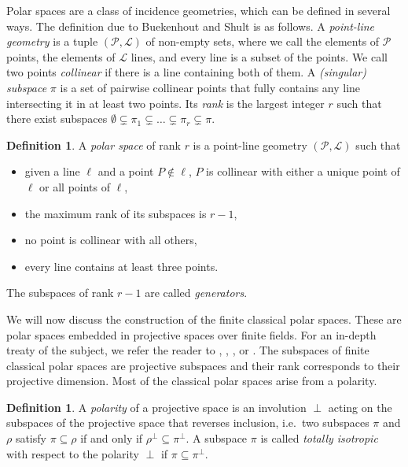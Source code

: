 \documentclass[a4paper]{article}
\theoremstyle{definition}
\newtheorem{df}[thm]{Definition}
\newcommand{\pp}{\mathcal P}
\newcommand{\ml}{\mathcal L}
\begin{document}
Polar spaces are a class of incidence geometries, which can be defined in several ways.
The definition due to Buekenhout and Shult \cite{buekenhoutshult} is as follows.
A \emph{point-line geometry} is a tuple $(\pp,\ml)$ of non-empty sets, where we call the elements of $\pp$ points, the elements of $\ml$ lines, and every line is a subset of the points.
We call two points \emph{collinear} if there is a line containing both of them.
A \emph{(singular) subspace} $\pi$ is a set of pairwise collinear points that fully contains any line intersecting it in at least two points.
Its \emph{rank} is the largest integer $r$ such that there exist subspaces $\emptyset \subsetneq \pi_1 \subsetneq \ldots \subsetneq \pi_r \subsetneq \pi$.
\begin{df}
 A \emph{polar space} of rank $r$ is a point-line geometry $(\pp,\ml)$ such that
 \begin{itemize}
  \item given a line $\ell$ and a point $P \notin \ell$, $P$ is collinear with either a unique point of $\ell$ or all points of $\ell$,
  \item the maximum rank of its subspaces is $r-1$,
  \item no point is collinear with all others,
  \item every line contains at least three points.
 \end{itemize}
 The subspaces of rank $r-1$ are called \emph{generators}.
\end{df}

We will now discuss the construction of the finite classical polar spaces.
These are polar spaces embedded in projective spaces over finite fields.
For an in-depth treaty of the subject, we refer the reader to \cite[\S 2]{brouwervanmaldeghem}, \cite[\S\S 1, 2, 5.1]{hirschfeldthas}, \cite[\S 7]{Shult11}, or \cite{BuekenhoutCameron}. 
The subspaces of finite classical polar spaces are projective subspaces and their rank corresponds to their projective dimension.
Most of the classical polar spaces arise from a polarity.

\begin{df}
 A \emph{polarity} of a projective space is an involution $\perp$ acting on the subspaces of the projective space that reverses inclusion, i.e.\ two subspaces $\pi$ and $\rho$ satisfy $\pi \subseteq \rho$ if and only if $\rho^\perp \subseteq \pi^\perp$.
 A subspace $\pi$ is called \emph{totally isotropic} with respect to the polarity $\perp$ if $\pi \subseteq \pi^\perp$.
\end{df}
\end{document}
